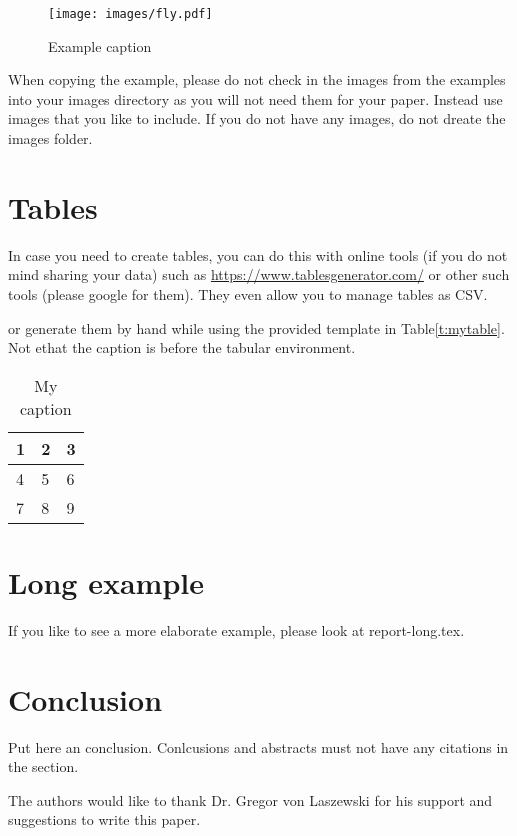 \documentclass[sigconf]{acmart}
\begin{document}
\begin{figure}[!ht]
  \centering\texttt{[image: images/fly.pdf]}
  \caption{Example caption}\label{f:fly}
\end{figure}

When copying the example, please do not check in the images from the
examples into your images directory as you will not need them for your
paper. Instead use images that you like to include. If you do not have
any images, do not dreate the images folder.

\section{Tables}

In case you need to create tables, you can do this with online tools
(if you do not mind sharing your data) such as
\url{https://www.tablesgenerator.com/} or other such tools (please
google for them). They even allow you to manage tables as CSV.

or generate them by hand while using the provided template in Table\ref{t:mytable}. Not ethat
the caption is before the tabular environment.

\begin{table}[htb]
\centering
\caption{My caption}
\label{t:mytabble}
\begin{tabular}{lll}
1 & 2 & 3 \\
\hline
4 & 5 & 6 \\
7 & 8 & 9
\end{tabular}
\end{table}

\section{Long example}

If you like to see a more elaborate example, please look at
report-long.tex. 

\section{Conclusion}

Put here an conclusion. Conlcusions and abstracts must not have any
citations in the section.


\begin{acks}

  The authors would like to thank Dr. Gregor von Laszewski for his
  support and suggestions to write this paper.

\end{acks}
\end{document}
